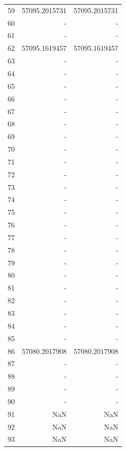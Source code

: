 \begin{appendix}
\begin{table}[h!]
\begin{tabular}{|l|r|r|}
59&57095.2015731 & 57095.2015731 \\
60&-             & -             \\
61&-             & -             \\
62&57095.1619457 & 57095.1619457 \\
63&-             & -             \\
64&-             & -             \\
65&-             & -             \\
66&-             & -             \\
67&-             & -             \\
68&-             & -             \\
69&-             & -             \\
70&-             & -             \\
71&-             & -             \\
72&-             & -             \\
73&-             & -             \\
74&-             & -             \\
75&-             & -             \\
76&-             & -             \\
77&-             & -             \\
78&-             & -             \\
79&-             & -             \\
80&-             & -             \\
81&-             & -             \\
82&-             & -             \\
83&-             & -             \\
84&-             & -             \\
85&-             & -             \\
86&57080.2017908 & 57080.2017908 \\
87&-             & -             \\
88&-             & -             \\
89&-             & -             \\
90&-             & -             \\
91&NaN           & NaN           \\
92&NaN           & NaN           \\
93&NaN           & NaN          \\\hline
\end{tabular}
\label{ap:tab1}
\end{table}
\pagebreak



\end{appendix}
